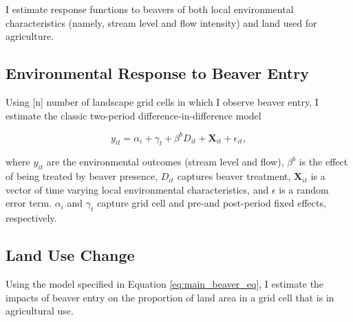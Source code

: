 I estimate response functions to beavers of both local environmental characteristics (namely, stream level and flow intensity) and land used for agriculture.

\subsection{Environmental Response to Beaver Entry}

Using [n] number of landscape grid cells in which I observe beaver entry, I estimate the classic two-period difference-in-difference model

\begin{equation} \label{eq:main_beaver_eq}
y_{it} = \alpha_i + \gamma_t + \beta^{b}D_{it} + \mathbf{X}_{it} + \epsilon_{it},
\end{equation}

where $y_{it}$ are the environmental outcomes (stream level and flow), $\beta^b$ is the effect of being treated by beaver presence, $D_{it}$ captures beaver treatment, $\mathbf{X}_{it}$ is a vector of time varying local environmental characteristics, and $\epsilon$ is a random error term. $\alpha_i$ and $\gamma_t$ capture grid cell and pre-and post-period fixed effects, respectively.



\subsection{Land Use Change}

Using the model specified in Equation \eqref{eq:main_beaver_eq}, I estimate the impacts of beaver entry on the proportion of land area in a grid cell that is in agricultural use. 